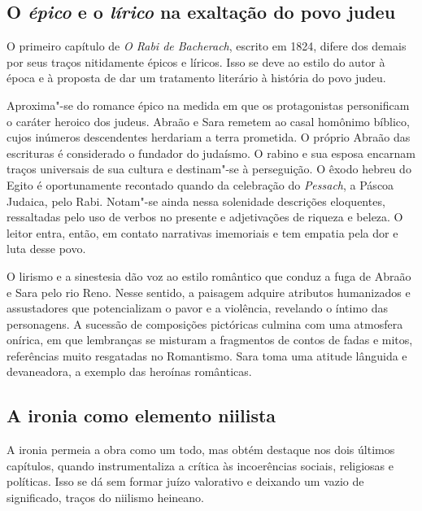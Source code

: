 \documentclass[12pt]{extarticle}
\begin{document}



\subsection{O \emph{épico} e o \emph{lírico} na exaltação do povo judeu}

O primeiro capítulo de \emph{O Rabi de Bacherach}, escrito em 1824, difere dos
demais por seus traços nitidamente épicos e líricos. Isso se deve ao
estilo do autor à época e à proposta de dar um tratamento literário à
história do povo judeu.

Aproxima"-se do romance épico na medida em que os protagonistas
personificam o caráter heroico dos judeus. Abraão e Sara remetem ao
casal homônimo bíblico, cujos inúmeros descendentes herdariam a terra
prometida. O próprio Abraão das escrituras é considerado o fundador do
judaísmo. O rabino e sua esposa encarnam traços universais de sua
cultura e destinam"-se à perseguição. O êxodo hebreu do Egito é
oportunamente recontado quando da celebração do \emph{Pessach}, a Páscoa Judaica, pelo
Rabi. Notam"-se ainda nessa solenidade descrições eloquentes, ressaltadas
pelo uso de verbos no presente e adjetivações de riqueza e beleza. O
leitor entra, então, em contato narrativas imemoriais e tem empatia pela
dor e luta desse povo.




O lirismo e a sinestesia dão voz ao estilo romântico que conduz a fuga
de Abraão e Sara pelo rio Reno. Nesse sentido, a paisagem adquire
atributos humanizados e assustadores que potencializam o pavor e a
violência, revelando o íntimo das personagens. A sucessão de composições
pictóricas culmina com uma atmosfera onírica, em que lembranças se
misturam a fragmentos de contos de fadas e mitos, referências muito
resgatadas no Romantismo. Sara toma uma atitude lânguida e devaneadora,
a exemplo das heroínas românticas.

\subsection{A ironia como elemento niilista}

A ironia permeia a obra como um todo, mas obtém destaque nos dois
últimos capítulos, quando instrumentaliza a crítica às incoerências
sociais, religiosas e políticas. Isso se dá sem formar juízo valorativo
e deixando um vazio de significado, traços do niilismo heineano.
\end{document}
